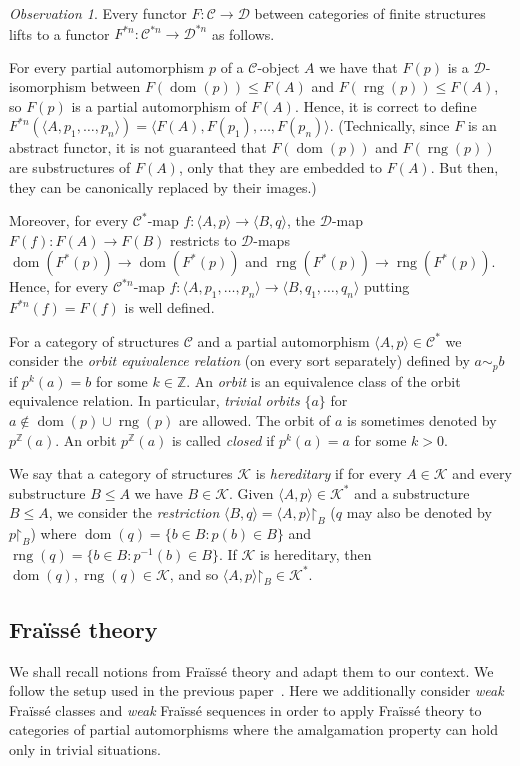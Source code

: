 \documentclass[10pt,a4paper]{article}
\theoremstyle{definition}
\theoremstyle{remark}
\newtheorem{observation}[tw]{Observation}
\newcommand \set [1]{\{#1\}}
\newcommand \seq [1]{\langle #1 \rangle}
\newcommand \maps {\colon} %
\newcommand \restr [1] {\mathord{\upharpoonright}_{#1}}
\newcommand \dom {\operatorname{dom}}
\newcommand \rng {\operatorname{rng}}
\newcommand \Z {\mathbb{Z}}
\newcommand \C {\mathscr{C}}
\newcommand \D {\mathscr{D}}
\newcommand \K {\mathscr{K}}
\begin{document}
\begin{observation}
Every functor $F\maps \C \to \D$ between categories of finite structures lifts to a functor $F^{*n}\maps \C^{*n} \to \D^{*n}$ as follows.

For every partial automorphism $p$ of a $\C$-object $A$ we have that $F(p)$ is a $\D$-isomorphism between $F(\dom(p)) \leq F(A)$ and $F(\rng(p)) \leq F(A)$, so $F(p)$ is a partial automorphism of $F(A)$.
Hence, it is correct to define $F^{*n}(\seq{A, p_1, \ldots, p_n}) = \seq{F(A), F(p_1), \ldots, F(p_n)}$.
(Technically, since $F$ is an abstract functor, it is not guaranteed that $F(\dom(p))$ and $F(\rng(p))$ are substructures of $F(A)$, only that they are embedded to $F(A)$.
But then, they can be canonically replaced by their images.)

Moreover, for every $\C^*$-map $f\maps \seq{A, p} \to \seq{B, q}$,  the $\D$-map $F(f)\maps F(A) \to F(B)$ restricts to  $\D$-maps $\dom(F^*(p)) \to \dom(F^*(p))$ and $\rng(F^*(p)) \to \rng(F^*(p))$.
Hence, for every $\C^{*n}$-map $f\maps \seq{A, p_1, \ldots, p_n} \to \seq{B, q_1, \ldots, q_n}$ putting $F^{*n}(f) = F(f)$ is well defined.
\end{observation}

For a category of structures $\C$ and a partial automorphism $\seq{A, p} \in \C^*$ we consider the \emph{orbit equivalence relation} (on every sort separately) defined by $a \sim_p b$ if $p^k(a) = b$ for some $k \in \Z$.
An \emph{orbit} is an equivalence class of the orbit equivalence relation.
In particular, \emph{trivial orbits} $\set{a}$ for $a \notin \dom(p) \cup \rng(p)$ are allowed.
The orbit of $a$ is sometimes denoted by $p^\Z(a)$.
An orbit $p^\Z(a)$ is called \emph{closed} if $p^k(a) = a$ for some $k > 0$.

We say that a category of structures $\K$ is \emph{hereditary} if for every $A \in \K$ and every substructure $B \leq A$ we have $B \in \K$.
Given $\seq{A, p} \in \K^*$ and a substructure $B \leq A$, we consider the \emph{restriction} $\seq{B, q} = \seq{A, p}\restr{B}$ ($q$ may also be denoted by $p\restr{B}$) where $\dom(q) = \set{b \in B: p(b) \in B}$ and $\rng(q) = \set{b \in B: p^{-1}(b) \in B}$.
If $\K$ is hereditary, then $\dom(q), \rng(q) \in \K$, and so $\seq{A, p}\restr{B} \in \K^*$.


\subsection{Fraïssé theory}

We shall recall notions from Fraïssé theory and adapt them to our context.
We follow the setup used in the previous paper~\cite{paper1}.
Here we additionally consider \emph{weak} Fraïssé classes and \emph{weak} Fraïssé sequences in order to apply Fraïssé theory to categories of partial automorphisms where the amalgamation property can hold only in trivial situations.
\end{document}
